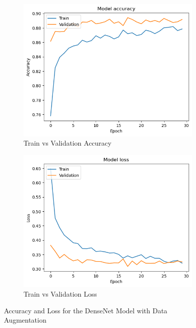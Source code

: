 \begin{figure}[H]
    \centering
    \begin{subfigure}[t]{0.45\textwidth} 
        \centering
        \includegraphics[width=\textwidth]{images/densenet_accuracy_dataaug.png}
        \caption{Train vs Validation Accuracy}
        \label{fig:subfig1}
    \end{subfigure}
    \hfill
    \begin{subfigure}[t]{0.45\textwidth}
        \centering
        \includegraphics[width=\textwidth]{images/densenet_loss_dataaug.png}
        \caption{Train vs Validation Loss}
        \label{fig:subfig2}
    \end{subfigure}
    \caption{Accuracy and Loss for the DenseNet Model with Data Augmentation}
    \label{fig:images}
\end{figure}

